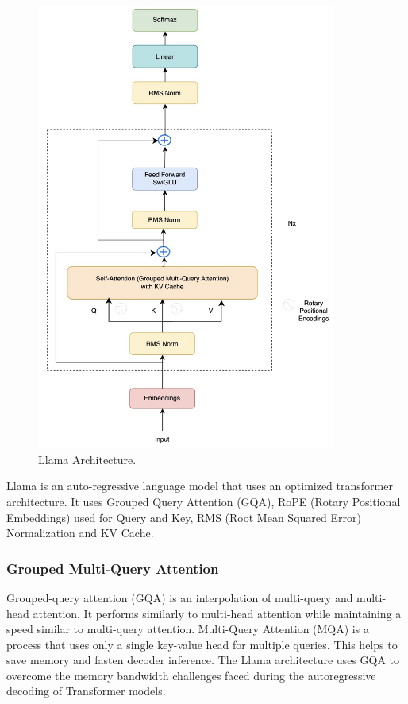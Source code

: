 \begin{figure}[h!]
    \centering
    \includegraphics[width=0.88\textwidth]{Figures/experiments/llama_arch.jpeg} 
    \caption{Llama Architecture.}
    \label{fig:LlamaArch}
\end{figure}

Llama \cite{touvron2023llama} is an auto-regressive language model that uses an optimized transformer architecture. It uses Grouped Query Attention (GQA), RoPE (Rotary Positional Embeddings) used for Query and Key, RMS (Root Mean Squared Error) Normalization and KV Cache. 

\subsubsection{Grouped Multi-Query Attention} 
Grouped-query attention (GQA) is an interpolation of multi-query and multi-head attention. It performs similarly to multi-head attention while maintaining a speed similar to multi-query attention. Multi-Query Attention (MQA) is a process that uses only a single key-value head for multiple queries. This helps to save memory and fasten decoder inference. The Llama architecture uses GQA to overcome the memory bandwidth challenges faced during the autoregressive decoding of Transformer models.

